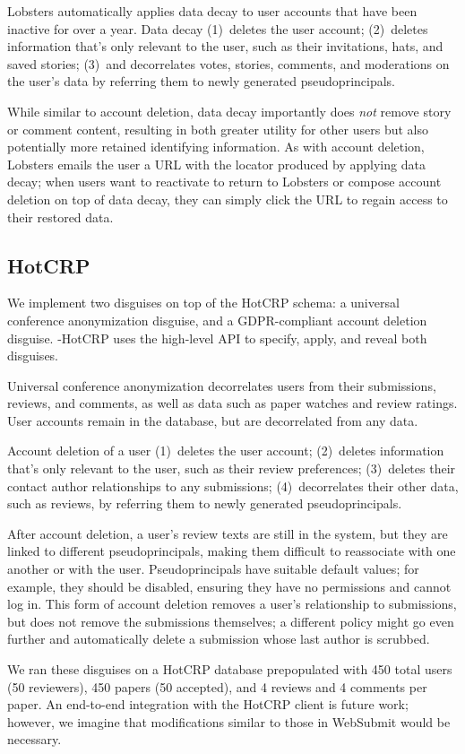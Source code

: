 Lobsters automatically applies data decay to user accounts that have been inactive for over a year.
Data decay 
%
(1)~deletes the user account;
%
(2)~deletes information that's only relevant to the user, such as their invitations, hats, and saved
stories;
%
(3)~and decorrelates votes, stories, comments, and moderations on the user's data by referring them
to newly generated pseudoprincipals.
%

While similar to account deletion, data decay importantly does \emph{not} remove story or comment
content, resulting in both greater utility for other users but also potentially more retained
identifying information.  As with account deletion, Lobsters emails the user a URL with the locator
produced by applying data decay; when users want to reactivate to return to Lobsters or compose
account deletion on top of data decay, they can simply click the URL to regain access to their
restored data.

\subsection{HotCRP}
We implement two disguises on top of the HotCRP schema: a universal conference anonymization disguise, and a
GDPR-compliant account deletion disguise.
\sys-HotCRP uses the high-level \sys API to specify, apply, and reveal both disguises.

Universal conference anonymization decorrelates users from their submissions, reviews, and comments,
as well as data such as paper watches and review ratings. User accounts remain in the database, but
are decorrelated from any data.

 Account deletion of a user 
%
(1)~deletes the user account;
%
(2)~deletes information that's only relevant to the user, such as their review preferences;
%
(3)~deletes their contact author relationships to any submissions;
%
(4)~decorrelates their other data, such as reviews, by referring them to newly generated pseudoprincipals.

After account deletion, a user's review texts are still in the system, but they are linked to
different pseudoprincipals, making them difficult to reassociate with one another or with the user.
%
Pseudoprincipals have suitable default values; for example, they should be disabled, ensuring they
have no permissions and cannot log in.
%
This form of account deletion removes a user's relationship to submissions, but does not remove the
submissions themselves; a different policy might go even further and automatically delete a
submission whose last author is scrubbed.

We ran these disguises on a HotCRP database prepopulated with 450 total users (50 reviewers), 450 papers
(50 accepted), and 4 reviews and 4 comments per paper. 
An end-to-end integration with the HotCRP client is future work; however, we imagine that
modifications similar to those in WebSubmit would be necessary.

